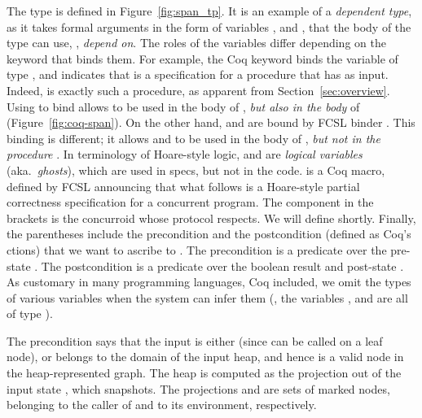 The type  is defined in Figure~\ref{fig:span_tp}.
%
It is an example of a \emph{dependent type}, as it takes formal
arguments in the form of variables ,  and ,
that the body of the type can use, \ie, \emph{depend on}.  The roles of
the variables differ depending on the keyword that binds them.
%
For example, the Coq keyword  binds the variable 
of type , and indicates that  is a
specification for a procedure that has  as input. Indeed,
 is exactly such a procedure, as apparent from
Section~\ref{sec:overview}. Using  to bind 
allows  to be used in the body of , \emph{but
  also in the body} of  (Figure~\ref{fig:coq-span}).
%
On the other hand,  and  are bound by FCSL binder
. This binding is different; it allows  and
 to be used in the body of , \emph{but not in
  the procedure} . In terminology of Hoare-style logic,
 and  are \emph{logical variables}
(aka.~\emph{ghosts}), which are used in specs, but not in the code.
%
 is a Coq macro, defined by FCSL announcing that what
follows is a Hoare-style partial correctness specification for a
concurrent program. The component  in the brackets
is the concurroid whose protocol  respects. We will
define  shortly. Finally, the parentheses
include the precondition and the postcondition (defined as Coq's
ctions) that we want to ascribe to . The
precondition is a predicate over the pre-state . The
postcondition is a predicate over the boolean result  and
post-state . As customary in many programming languages, Coq
included, we omit the types of various variables when the system can
infer them (\eg, the variables ,  and  are
all of type ).

The precondition says that the input  is either 
(since  can be called on a leaf node), or belongs to the
domain of the input heap, and hence is a valid node in the
heap-represented graph. The heap is computed as the projection
 out of the input state , which 
snapshots.  The projections  and  are sets of
marked nodes, belonging to the caller of  and to its
environment, respectively.

